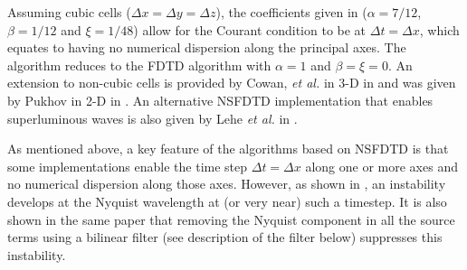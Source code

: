 Assuming cubic cells ($\Delta x=\Delta y=\Delta z$), the coefficients
given in \cite{Karkicap06} ($\alpha=7/12$, $\beta=1/12$ and $\xi=1/48$)
allow for the Courant condition to be at $\Delta t=\Delta x$, which
equates to having no numerical dispersion along the principal axes.
The algorithm reduces to the FDTD algorithm with $\alpha=1$ and $\beta=\xi=0$.
An extension to non-cubic cells is provided by Cowan, \emph{et al.}
in 3-D in \cite{CowanPRSTAB13} and was given by Pukhov in 2-D in
\cite{PukhovJPP99}. An alternative NSFDTD implementation that enables superluminous waves is also
given by Lehe {\it et al.} in \cite{LehePRSTAB13}. 

As mentioned above, a key feature of the algorithms based on NSFDTD
is that some implementations \cite{Karkicap06,CowanPRSTAB13} enable the time step $\Delta t=\Delta x$ along one or
more axes and no numerical dispersion along those axes. However, as
shown in \cite{Vayjcp2011}, an instability develops at the Nyquist
wavelength at (or very near) such a timestep. It is also shown in
the same paper that removing the Nyquist component in all the source
terms using a bilinear filter (see description of the filter below)
suppresses this instability.

